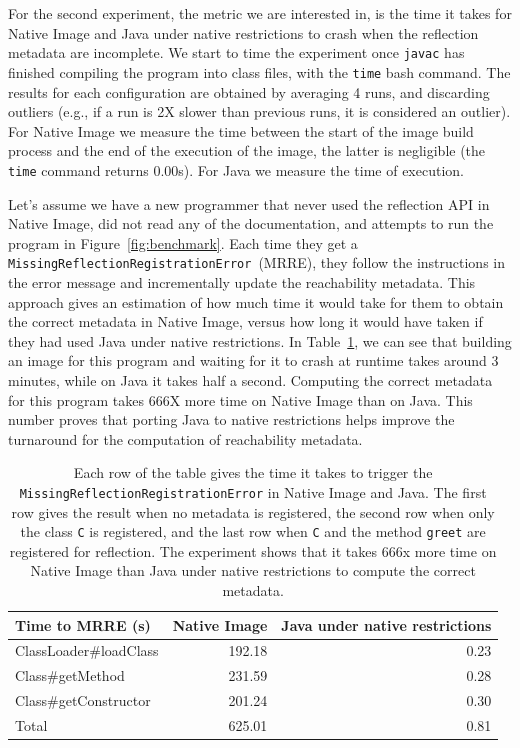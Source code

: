 For the second experiment, the metric we are interested in, is the time it takes for Native Image and Java under native restrictions to crash when the reflection metadata are incomplete. 
We start to time the experiment once \verb|javac| has finished compiling the program into class files, with the \verb|time| bash command. 
The results for each configuration are obtained by averaging 4 runs, and discarding outliers (e.g., if a run is 2X slower than previous runs, it is considered an outlier).
For Native Image we measure the time between the start of the image build process and the end of the execution of the image, the latter is negligible (the \verb|time| command returns 0.00s). For Java we measure the time of execution.

Let's assume we have a new programmer that never used the reflection API in Native Image, did not read any of the documentation, and attempts to run the program in Figure~\ref{fig:benchmark}. Each time they get a \verb|MissingReflectionRegistrationError|~(MRRE), they follow the instructions in the error message and incrementally update the reachability metadata.
This approach gives an estimation of how much time it would take for them to obtain the correct metadata in Native Image, versus how long it would have taken if they had used Java under native restrictions. 
In Table~\ref{tab:benchmark}, we can see that building an image for this program and waiting for it to crash at runtime takes around 3 minutes, while on Java it takes half a second. Computing the correct metadata for this program takes 666X more time on Native Image than on Java.
This number proves that porting Java to native restrictions helps improve the turnaround for the computation of reachability metadata.

\begin{table}[ht]
\centering
\begin{tabular}{@{}lrr@{}}
\toprule
Time to MRRE (s) & \multicolumn{1}{l}{Native Image} & \multicolumn{1}{l}{Java under native restrictions} \\ \midrule
ClassLoader\#loadClass          & 192.18 & 0.23 \\
Class\#getMethod                & 231.59 & 0.28 \\
Class\#getConstructor           & 201.24 & 0.30 \\ \midrule
Total                           & 625.01 & 0.81 \\ \bottomrule
\end{tabular}
\caption{Each row of the table gives the time it takes to trigger the \texttt{MissingReflectionRegistrationError} in Native Image and Java. The first row gives the result when no metadata is registered, the second row when only the class \texttt{C} is registered, and the last row when \texttt{C} and the method \texttt{greet} are registered for reflection. The experiment shows that it takes 666x more time on Native Image than Java under native restrictions to compute the correct metadata.}
\label{tab:benchmark}
\end{table}

